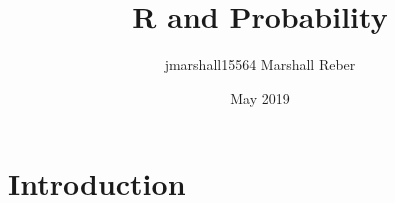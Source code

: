 \documentclass{article}
\title{R and Probability}
\author{jmarshall15564 Marshall Reber}
\date{May 2019}
\begin{document}
\maketitle

\section{Introduction}
\end{document}
